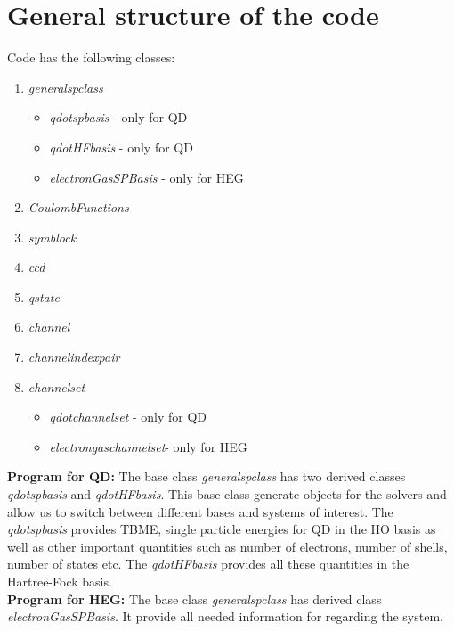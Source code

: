 \section{General structure of the code}\label{sec:impl1}
Code has the following classes:
\begin{enumerate}
\item  \textit{generalspclass} 
	\begin{itemize}
	\item \textit{qdotspbasis} - only for QD
	\item \textit{qdotHFbasis} - only for QD
	\item \textit{electronGasSPBasis} - only for HEG
	\end{itemize}
\item \textit{CoulombFunctions}	
\item \textit{symblock}
\item \textit{ccd}
\item \textit{qstate}
\item \textit{channel}
\item \textit{channelindexpair}
\item \textit{channelset}

\begin{itemize}
	\item \textit{qdotchannelset} - only for QD
	\item \textit{electrongaschannelset}- only for HEG
\end{itemize}
\end{enumerate}
\textbf{Program for QD:}
The base class \textit{generalspclass} has two derived classes \textit{qdotspbasis} and \textit{qdotHFbasis}. This base class generate objects for the solvers and allow us to switch between different bases and systems of interest. The \textit{qdotspbasis} provides TBME, single particle energies for QD in the HO basis as well as other important quantities such as number of electrons, number of shells, number of states etc. The \textit{qdotHFbasis} provides all these quantities in the Hartree-Fock basis. \\
\textbf{Program for HEG:}
The base class \textit{generalspclass} has derived class \textit{electronGasSPBasis}. It provide all needed information for regarding the system.

